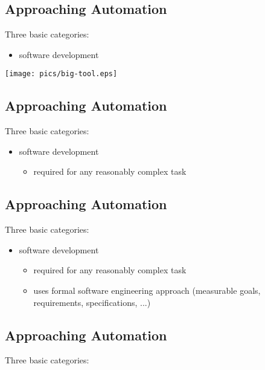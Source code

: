 \documentclass[xga]{xdvislides}
\begin{document}
\subsection{Approaching Automation}
Three basic categories:
\\

\begin{itemize}
	\item software development
\end{itemize}
\vspace*{\fill}
\begin{center}
	\texttt{[image: pics/big-tool.eps]}
\end{center}
\vspace*{\fill}


\subsection{Approaching Automation}
Three basic categories:
\\

\begin{itemize}
	\item software development
		\begin{itemize}
			\item required for any reasonably complex task
		\end{itemize}
\end{itemize}

\subsection{Approaching Automation}
Three basic categories:
\\

\begin{itemize}
	\item software development
		\begin{itemize}
			\item required for any reasonably complex task
			\item uses formal software engineering approach (measurable goals,
				requirements, specifications, ...)
		\end{itemize}
\end{itemize}

\subsection{Approaching Automation}
Three basic categories:
\\
\end{document}
